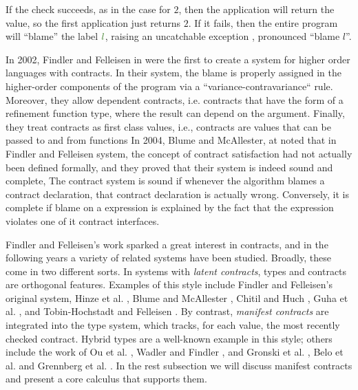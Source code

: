 If the check succeeds, as in the case for $2$,
then the application will return the value, so the first 
application just returns $2$.
If it fails, then the entire program will ``blame'' the label $\mklabel{l}$,
raising an uncatchable exception  , pronounced ``blame $l$''.

\begin{comment}
Assigning blame for contractual violations in higher-order languages
is complex:
%
The boundaries between cooperating components are more obscure 
than in the world with only first-order functions. 
A function may invoke a function passed to it at its call side.
Accordingly, the blame for a corresponding contract violation must 
lie with the supplier of the bad value, 
no matter if the bad value was passed by directly applying 
a function or by applying a base value.
%
\end{comment}
In 2002, Findler and Felleisen in \cite{Findler02} were the first to
create a system for higher order languages with contracts.
%
In their system, the blame is properly assigned in the 
higher-order components of the program via a
``variance-contravariance`` rule.
Moreover,
they allow dependent contracts, i.e. 
contracts that have the form of a refinement function type, 
where the result can depend on the argument.
Finally,
they treat contracts as first class values, 
i.e., contracts are values that can be passed to and from functions
%
In 2004, Blume and McAllester, at \cite{BlumeM06} noted that 
in Findler and Felleisen system,
the concept of contract satisfaction had not actually been defined
formally, and they proved that their system is indeed
sound and complete, 
%
The contract system is sound if whenever
the algorithm blames a contract declaration, 
that contract declaration is actually wrong.
%
Conversely, it is complete if blame on a expression is explained
by the fact that the expression violates one of it contract interfaces.

Findler and Felleisen's work sparked a great interest
in contracts, and in the following years a variety
of related systems have been studied. 
Broadly, these come in two different sorts. 
%
In systems with \textit{latent contracts}, types and contracts
are orthogonal features. Examples of this style include Findler
and Felleisen's original system, Hinze et al. \cite{Hinze06}, Blume and
McAllester \cite{BlumeM06}, Chitil and Huch \cite{ChitilH07}, Guha et al. \cite{GuhaMFK07},
and Tobin-Hochstadt and Felleisen \cite{Tobin-HochstadtF08}. 
By contrast, \textit{manifest contracts} are integrated into the type system, 
which tracks, for each value, the most recently checked contract. 
Hybrid types \cite{flanagan06} are a well-known example in this style; others include the
work of Ou et al. \cite{Ou2004}, Wadler and Findler \cite{WadlerF09}, and Gronski
et al. \cite{Gronski06}, Belo et al. \cite{Greenberg11} and Grennberg et al. \cite{Greenberg12}.
%
In the rest subsection we will discuss manifest contracts and
present a core calculus that supports them.

